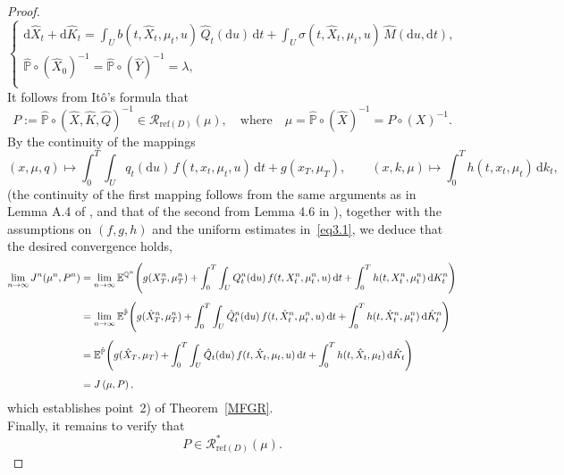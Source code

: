 \documentclass[11pt,amsfonts]{article}
\theoremstyle{plain}
\theoremstyle{assumpstyle}
\numberwithin{equation}{section}
\numberwithin{theorem}{section}
\numberwithin{proposition}{section}
\numberwithin{definition}{section}
\numberwithin{remark}{section}
\numberwithin{corollary}{section}
\numberwithin{lemma}{section}
\begin{document}
\begin{proof}
\begin{equation}
\begin{cases}
\mathrm{d}\hat{X}_t+ 
\mathrm{d}\hat{K}_t
= 
\displaystyle\int_{U} b(t, \hat{X}_t, \mu_t, u)\, 
\hat{Q}_t(\mathrm{d}u)\,\mathrm{d}t
+ 
\displaystyle\int_{U} \sigma(t, \hat{X}_t, \mu_t, u)\,
\hat{M}(\mathrm{d}u,\mathrm{d}t)
, \\[6pt]
\hat{\mathbb{P}} \circ (\hat{X}_0)^{-1} 
= \hat{\mathbb{P}} \circ (\hat{Y})^{-1} = \lambda, \\[4pt]
\end{cases}
\end{equation}
It follows from Itô’s formula that
\begin{equation*}
P:=\hat{\mathbb{P}} \circ (\hat{X}, \hat{K}, \hat{Q})^{-1}
\in 
\mathcal{R}_{\mathrm{ref}(D)}(\mu), \quad \text{where} \quad \mu = \hat{\mathbb{P}} \circ (\hat{X})^{-1}= P\circ(X)^{-1}.
\end{equation*}
By the continuity of the mappings  
\begin{equation*}
(x, \mu, q) \longmapsto 
\int_0^{T} \int_U 
q_t(\mathrm{d}u)\, 
f(t, x_t, \mu_t, u)\,\mathrm{d}t 
+ g(x_T, \mu_T),
\qquad
(x, k, \mu) \longmapsto 
\int_{0}^{T} 
h(t, x_t, \mu_t)\,\mathrm{d}k_t,
\end{equation*}
(the continuity of the first mapping follows from the same arguments as in Lemma A.4 of \cite{luciano}, and that of the second from Lemma 4.6 in \cite{badr}), together with the assumptions on $(f, g, h)$ and the uniform estimates in~\eqref{eq3.1}, we deduce that the desired convergence holds,
\begin{align}\label{Con-cost1}
\lim_{n \to \infty} J^n(\mu^n, P^n)
&= 
\lim_{n \to \infty} 
\mathbb{E}^{\mathbb{Q}^n}
\Bigg(
g(X^n_T, \mu^n_T)
+
\int_0^T \int_U 
Q^n_t(\mathrm{d}u)\,
f(t, X^n_t, \mu^n_t, u)\,\mathrm{d}t
+
\int_0^T 
h(t, X^n_t, \mu^n_t)\,
\mathrm{d}K^n_t
\Bigg)
\notag\\[4pt]
&=
\lim_{n \to \infty} 
\mathbb{E}^{\hat{\mathbb{P}}}
\Bigg(
g(\hat{X}^n_T, \mu^n_T)
+
\int_0^T \int_U 
\hat{Q}^n_t(\mathrm{d}u)\,
f(t, \hat{X}^n_t, \mu^n_t, u)\,\mathrm{d}t
+
\int_0^T 
h(t, \hat{X}^n_t, \mu^n_t)\,
\mathrm{d}\hat{K}^n_t
\Bigg)
\notag\\[4pt]
&=\mathbb{E}^{\hat{\mathbb{P}}}
\Bigg(
g(\hat{X}_T, \mu_T)
+
\int_0^T \int_U 
\hat{Q}_t(\mathrm{d}u)\,
f(t, \hat{X}_t, \mu_t, u)\,\mathrm{d}t
+
\int_0^T 
h(t, \hat{X}_t, \mu_t)\,
\mathrm{d}\hat{K}_t
\Bigg)
\notag\\[4pt]
&=
J\left(\mu, P\right),
\end{align}
which establishes point~2) of Theorem~\ref{MFGR}.\\
Finally, it remains to verify that
\begin{equation*}
P \in \mathcal{R}^*_{\mathrm{ref}(D)}(\mu).
\end{equation*}
\end{proof}
\end{document}
